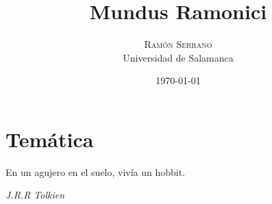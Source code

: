 \documentclass[twoside]{article}
\title{Mundus Ramonici} %
\author{%
\textsc{Ramón Serrano} \\[1ex] %
\normalsize Universidad de Salamanca \\ %
}
\date{\today} %
\newcommand\myemptypage{
    \null{}
    \thispagestyle{empty}
    \addtocounter{page}{-1}
    \newpage
    }
\begin{document}
\maketitle
\myemptypage{}
\pagestyle{empty}
\tableofcontents
\restoregeometry{}
\myemptypage{}


\pagestyle{fancy}


\hypertarget{i-temuxe1tica}{%
  \section{Temática}\label{i-temuxe1tica}}
\epigraph{En un agujero en el suelo, vivía un hobbit.}{\textit{J.R.R Tolkien}}
\end{document}
